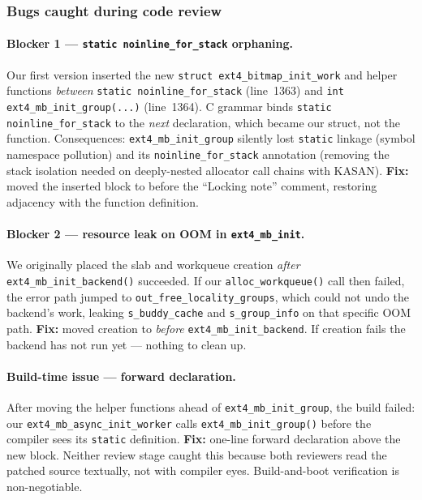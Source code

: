 \documentclass[12pt,a4paper]{article}
\begin{document}
\subsubsection{Bugs caught during code review}

\paragraph{Blocker 1 --- \texttt{static noinline\_for\_stack} orphaning.}
Our first version inserted the new \texttt{struct
ext4\_bitmap\_init\_work} and helper functions \emph{between}
\texttt{static noinline\_for\_stack} (line~1363) and
\texttt{int ext4\_mb\_init\_group(...)} (line~1364).  C grammar
binds \texttt{static noinline\_for\_stack} to the \emph{next}
declaration, which became our struct, not the function.
Consequences: \texttt{ext4\_mb\_init\_group} silently lost
\texttt{static} linkage (symbol namespace pollution) and its
\texttt{noinline\_for\_stack} annotation (removing the stack
isolation needed on deeply-nested allocator call chains with KASAN).
\textbf{Fix:} moved the inserted block to before the ``Locking note''
comment, restoring adjacency with the function definition.

\paragraph{Blocker 2 --- resource leak on OOM in \texttt{ext4\_mb\_init}.}
We originally placed the slab and workqueue creation \emph{after}
\texttt{ext4\_mb\_init\_backend()} succeeded.  If our
\texttt{alloc\_workqueue()} call then failed, the error path jumped
to \texttt{out\_free\_locality\_groups}, which could not undo
the backend's work, leaking \texttt{s\_buddy\_cache} and
\texttt{s\_group\_info} on that specific OOM path.
\textbf{Fix:} moved creation to \emph{before}
\texttt{ext4\_mb\_init\_backend}.  If creation fails the backend has
not run yet --- nothing to clean up.

\paragraph{Build-time issue --- forward declaration.}
After moving the helper functions ahead of
\texttt{ext4\_mb\_init\_group}, the build failed: our
\texttt{ext4\_mb\_async\_init\_worker} calls
\texttt{ext4\_mb\_init\_group()} before the compiler sees its
\texttt{static} definition.  \textbf{Fix:} one-line forward
declaration above the new block.  Neither review stage caught this
because both reviewers read the patched source textually, not with
compiler eyes.  Build-and-boot verification is non-negotiable.
\end{document}
